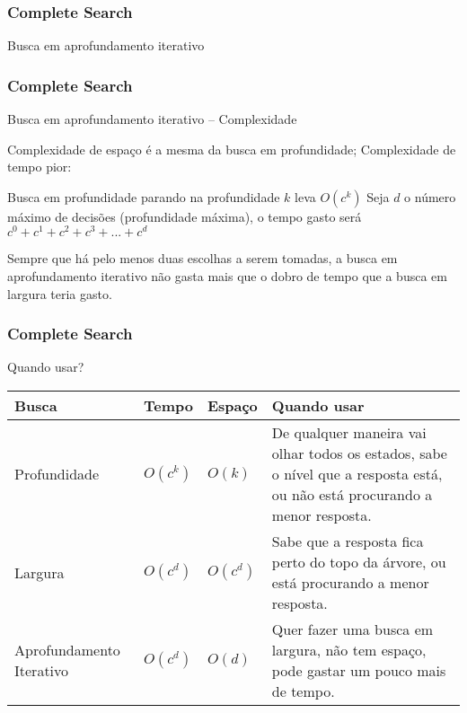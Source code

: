 \begin{frame}
\frametitle{Complete Search}
\begin{block}{Busca em aprofundamento iterativo}
\end{block}
\end{frame}

\begin{frame}
\frametitle{Complete Search}
\begin{block}{Busca em aprofundamento iterativo -- Complexidade}

\begin{itemize}
	\bitem Complexidade de espaço é a mesma da busca em profundidade;
	\bitem Complexidade de tempo pior:
	\begin{itemize}
		\bitem Busca em profundidade parando na profundidade $k$ leva $O(c^k)$
		\bitem Seja $d$ o número máximo de decisões (profundidade máxima), o tempo gasto será $c^0 + c^1 + c^2 + c^3 + ... + c^d$
	\end{itemize}
	\bitem Sempre que há pelo menos duas escolhas a serem tomadas, a busca em aprofundamento iterativo
	não gasta mais que o dobro de tempo que a busca em largura teria gasto.
\end{itemize}	

\end{block}
\end{frame}

\begin{frame}
\frametitle{Complete Search}
\begin{block}{Quando usar?}
\begin{table}
    \begin{tabular}{|p{2.5cm}|l|l|p{5cm}|}
        \hline
        Busca                    & Tempo    & Espaço    & Quando usar                                                                                                                \\ \hline
        Profundidade             & $O(c^k)$ & $O(k)$    & De qualquer maneira vai olhar todos os estados, sabe o nível que a resposta está, ou não está procurando a menor resposta. \\ \hline
        Largura                  & $O(c^d)$ & $O(c^d)$  & Sabe que a resposta fica perto do topo da árvore, ou está procurando a menor resposta.                                     \\ \hline
        Aprofundamento Iterativo & $O(c^d)$ & $O(d)$    & Quer fazer uma busca em largura, não tem espaço, pode gastar um pouco mais de tempo.                                       \\
        \hline
    \end{tabular}
\end{table}
\end{block}
\end{frame}

